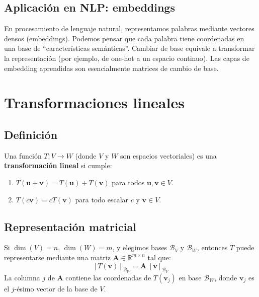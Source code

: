 \documentclass[12pt,a4paper,openany,oneside]{book}
\begin{document}
\subsection{Aplicación en NLP: embeddings}
En procesamiento de lenguaje natural, representamos palabras mediante vectores densos (embeddings). Podemos pensar que cada palabra tiene coordenadas en una base de ``características semánticas''. Cambiar de base equivale a transformar la representación (por ejemplo, de one-hot a un espacio continuo). Las capas de embedding aprendidas son esencialmente matrices de cambio de base.

\section{Transformaciones lineales}

\subsection{Definición}
Una función $T: V \to W$ (donde $V$ y $W$ son espacios vectoriales) es una \textbf{transformación lineal} si cumple:
\begin{enumerate}
    \item $T(\mathbf{u} + \mathbf{v}) = T(\mathbf{u}) + T(\mathbf{v})$ para todos $\mathbf{u}, \mathbf{v} \in V$.
    \item $T(c\mathbf{v}) = c T(\mathbf{v})$ para todo escalar $c$ y $\mathbf{v} \in V$.
\end{enumerate}

\subsection{Representación matricial}
Si $\dim(V)=n$, $\dim(W)=m$, y elegimos bases $\mathcal{B}_V$ y $\mathcal{B}_W$, entonces $T$ puede representarse mediante una matriz $\mathbf{A} \in \mathbb{R}^{m \times n}$ tal que:
\[
[T(\mathbf{v})]_{\mathcal{B}_W} = \mathbf{A} \; [\mathbf{v}]_{\mathcal{B}_V}
\]
La columna $j$ de $\mathbf{A}$ contiene las coordenadas de $T(\mathbf{v}_j)$ en base $\mathcal{B}_W$, donde $\mathbf{v}_j$ es el $j$-ésimo vector de la base de $V$.
\end{document}
